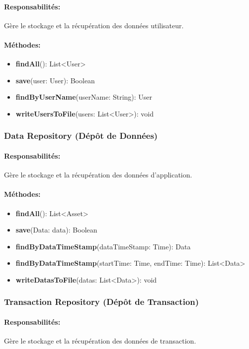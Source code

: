 \documentclass{article}
\begin{document}
\paragraph{Responsabilités:} Gère le stockage et la récupération des données utilisateur.
\paragraph{Méthodes:}
\begin{itemize}
  \item \textbf{findAll}(): List<User>
  \item \textbf{save}(user: User): Boolean
  \item \textbf{findByUserName}(userName: String): User
  \item \textbf{writeUsersToFile}(users: List<User>): void
\end{itemize}

\subsubsection{Data Repository (Dépôt de Données)}
\paragraph{Responsabilités:} Gère le stockage et la récupération des données d'application.
\paragraph{Méthodes:}
\begin{itemize}
  \item \textbf{findAll}(): List<Asset>
  \item \textbf{save}(Data: data): Boolean
  \item \textbf{findByDataTimeStamp}(dataTimeStamp: Time): Data
  \item \textbf{findByDataTimeStamp}(startTime: Time, endTime: Time): List<Data>
  \item \textbf{writeDatasToFile}(datas: List<Data>): void 
\end{itemize}
\subsubsection{Transaction Repository (Dépôt de Transaction)}
\paragraph{Responsabilités:} Gère le stockage et la récupération des données de transaction.
\end{document}
